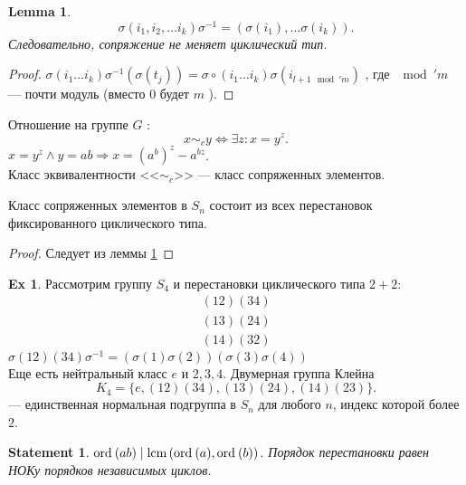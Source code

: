 \documentclass[11pt]{book}
\newcommand{\ord}{{\mathop{\text{\rm ord}}\:}}
\newcommand{\lcm}{{\mathop{\text{\rm lcm}}\,}}
\theoremstyle{definition}
\theoremstyle{plain}
\theoremstyle{plain}
\newtheorem{lm}{Lemma}
\newtheorem{st}{Statement}
\theoremstyle{definition}
\newtheorem*{ex}{Ex}
\theoremstyle{remark}
\begin{document}
\begin{lm}\label{lm_sim_group_1}
    \[
	\sigma (i_1, i_2, \ldots i_k) \sigma ^{-1} = ( \sigma (i_1), \ldots \sigma (i_k))
    .\]
    Следовательно, сопряжение не меняет циклический тип.
\end{lm}
\begin{proof}
    $\sigma (i_1 \ldots i_k) \sigma ^{-1} (\sigma (t_j))=  \sigma \circ (i_1 \ldots i_k) \sigma  (i_{l+1 \mod' m})$
    , где $\mod' m$ --- почти модуль (вместо 0 будет $m$ ).
\end{proof}
\begin{defn}
    Отношение на группе $G$ :
    \[
	x \sim_c y \Longleftrightarrow  \exists z: x = y^z
    .\]
    $x=y^z \wedge y=ab \Longrightarrow  x = (a^b)^z - a^{bz}$.\\
    Класс эквивалентности <<$\sim_{c}$>> --- класс сопряженных элементов.
\end{defn}
\begin{thm}
    Класс сопряженных элементов в $S_n$ состоит из всех перестановок  фиксированного циклического типа.
\end{thm}
\begin{proof}
    Следует из леммы \ref{lm_sim_group_1}
\end{proof}
\begin{ex}
    Рассмотрим группу $S_4$ и перестановки циклического типа $2+2$:
    \[
	\begin{array}{c}
	    (12)(34)\\
	    (13)(24)\\
	    (14)(32)
	\end{array}
    \]
    $\sigma (12)(34) \sigma ^{-1} = (\sigma (1) \sigma (2))(\sigma (3) \sigma (4))$\\
    Еще есть нейтральный класс $e$ и $2, 3, 4$.
    Двумерная группа Клейна
    \[
	K_4 =  \{e, (12)(34), (13)(24), (14)(23)\}
    .\]  --- единственная нормальная подгруппа в $S_n$ для любого $n$, индекс которой более $2$.
\end{ex}
\begin{st}
    $\ord(ab) \mid \lcm (\ord(a), \ord(b))$.
    Порядок перестановки равен НОКу порядков независимых циклов.
\end{st}
\end{document}
